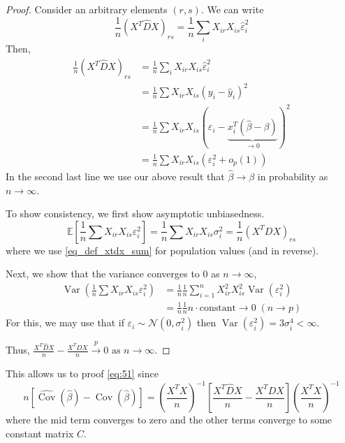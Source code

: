 \documentclass[11pt, %
	oneside, %
	english, %
	onehalfspacing, %
	]{article} %
\numberwithin{equation}{section}
\begin{document}
\begin{proof}
    Consider an arbitrary elements $(r,s)$. We can write
    \begin{equation}\label{eq_def_xtdx_sum}
        \frac{1}{n} \left( X^T \hat{D} X \right)_{rs} = \frac{1}{n} \sum_i X_{ir} X_{is} \hat{\varepsilon}_i^2
    \end{equation}
    Then,
    $$
    \begin{aligned}
    \frac{1}{n} \left( X^T \hat{D} X \right)_{rs} &= \frac{1}{n} \sum_i X_{ir} X_{is} \hat{\varepsilon}_i^2 \\
    &= \frac{1}{n} \sum X_{ir} X_{is} \left( y_i - \hat{y}_i \right)^2 \\
    &= \frac{1}{n} \sum X_{ir} X_{is} \left( \varepsilon_i - \underbrace{ x_i^T (\hat{\beta}- \beta) }_{ \to 0 } \right)^2 \\
    &= \frac{1}{n} \sum X_{ir} X_{is} \left(  \varepsilon_i^2 + o_p(1) \right)
    \end{aligned}
    $$
    In the second last line we use our above result that $\hat{\beta} \to \beta$ in probability as $n \to \infty$.

    To show consistency, we first show asymptotic unbiasedness.
    $$
    \mathbb{E} \left[ \frac{1}{n} \sum X_{ir} X_{is}  \varepsilon_i^2 \right] = \frac{1}{n} \sum X_{ir} X_{is}  \sigma^2_i = \frac{1}{n} (X^T D X)_{rs}
    $$
    where we use \eqref{eq_def_xtdx_sum} for population values (and in reverse).

    Next, we show that the variance converges to $0$ as $n \to \infty$,
    $$
    \begin{aligned}
    \operatorname{Var} \left(  \frac{1}{n} \sum X_{ir} X_{is}  \varepsilon_i^2 \right) &= \frac{1}{n} \frac{1}{n} \sum_{i = 1}^n X_{ir}^2 X_{is}^2  \operatorname{Var} \left( \varepsilon_i^2\right)\\
    &= \frac{1}{n} \frac{1}{n} n \cdot \text{constant} \to 0 \; (n \to p)
    \end{aligned}
    $$
    For this, we may use that if $\varepsilon_i \sim \mathcal{N}(0, \sigma^2_i)$ then $\operatorname{Var} \left( \varepsilon_i^2\right) = 3 \sigma^4_i < \infty$.

    Thus, $\frac{X^T \hat{D} X}{n} - \frac{X^T D X}{n} \overset{p}{\to} 0 \text{ as } n \to \infty$.
\end{proof}

This allows us to proof \eqref{eq:51} since
$$
n \left[\widehat{\operatorname{Cov}} \left( \hat{\beta}\right) -  \operatorname{Cov} \left( \hat{\beta}\right) \right] = \left(  \frac{X^TX}{n} \right)^{-1} \left[ \frac{X^T \hat{D} X}{n} - \frac{X^T D X}{n}\right] \left( \frac{X^TX}{n} \right)^{-1}
$$
where the mid term converges to zero and the other terms converge to some constant matrix $C$.
\end{document}
